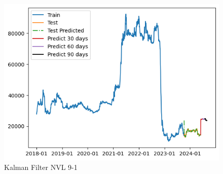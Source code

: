 \documentclass[conference]{IEEEtran}
\begin{document}
\begin{enumerate}
\begin{figure}[htbp]
\begin{minipage}{0.23\textwidth}
    \includegraphics[width=1\textwidth]{experiment/kf/NVL 9-1.png}
    \caption{Kalman Filter NVL 9-1}
    \label{fig:nvl_histogram}
    \end{minipage}
\end{figure}

\pagebreak
\begin{figure}[htbp]

\end{figure}
\end{enumerate}
\end{document}
